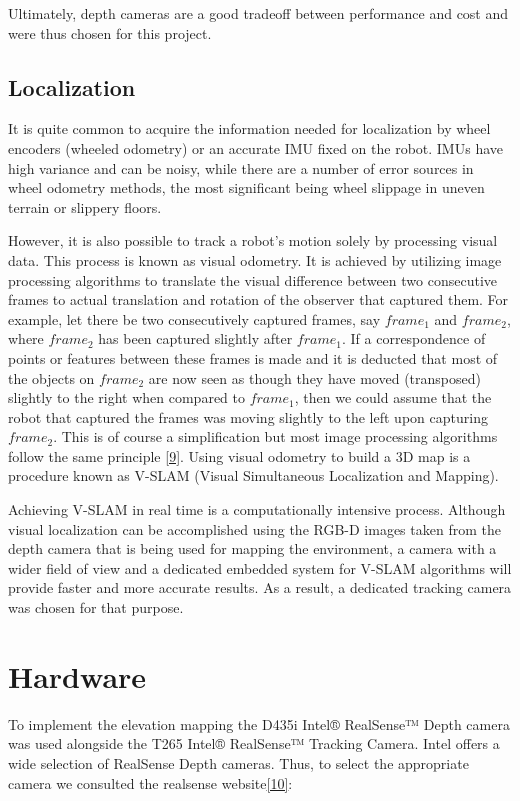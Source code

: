 \documentclass{article}
\begin{document}
Ultimately, depth cameras are a good tradeoff between performance and cost and were thus chosen for this project.


\subsection{Localization}

It is quite common to acquire the information needed for localization by wheel encoders (wheeled odometry) or an accurate IMU fixed on the robot. IMUs have high variance and can be noisy, while there are a number of error sources in wheel odometry methods, the most significant being wheel slippage in uneven terrain or slippery floors.

However, it is also possible to track a robot's motion solely by processing visual data. This process is known as visual odometry. It is achieved by utilizing image processing algorithms to translate the visual difference between two consecutive frames to actual translation and rotation of the observer that captured them. For example, let there be two consecutively captured frames, say $frame_1$ and $frame_2$, where $frame_2$ has been captured slightly after $frame_1$. If a correspondence of points or features between these frames is made and it is deducted that most of the objects on $frame_2$ are now seen as though they have moved (transposed) slightly to the right when compared to $frame_1$, then we could assume that the robot that captured the frames was moving slightly to the left upon capturing $frame_2$. This is of course a simplification but most image processing algorithms follow the same principle \href{https://en.wikipedia.org/wiki/Correspondence_problem}{[9]}. Using visual odometry to build a 3D map is a procedure known as V-SLAM (Visual Simultaneous Localization and Mapping). 

Achieving V-SLAM in real time is a computationally intensive process. Although visual localization can be accomplished using the RGB-D images taken from the depth camera that is being used for mapping the environment, a camera with a wider field of view and a dedicated embedded system for V-SLAM algorithms will provide faster and more accurate results. As a result, a dedicated tracking camera was chosen for that purpose.

\section{Hardware}

To implement the elevation mapping the D435i Intel® RealSense™  Depth camera was used alongside the T265 Intel® RealSense™  Tracking Camera. Intel offers a wide selection of RealSense Depth cameras. Thus, to select the appropriate camera we consulted the realsense website\href{https://www.intelrealsense.com/#Products}{[10]}:
\end{document}
